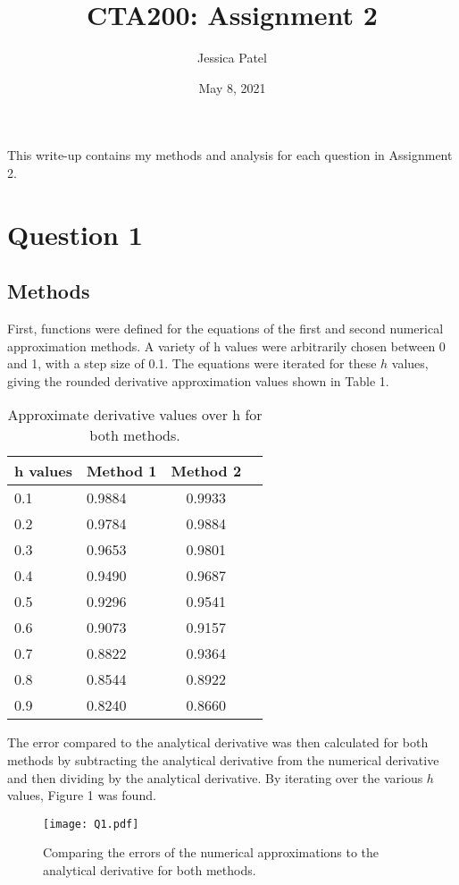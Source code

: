 \documentclass[12pt]{article}
\title{CTA200: Assignment 2}
\author{Jessica Patel}
\date{May 8, 2021}
\begin{document}
\maketitle

This write-up contains my methods and analysis for each question in Assignment 2.
\section{Question 1}
\subsection{Methods}
First, functions were defined for the equations of the first and second numerical approximation methods. A variety of h values were arbitrarily chosen between 0 and 1, with a step size of 0.1. The equations were iterated for these $h$ values, giving the rounded derivative approximation values shown in Table 1.

\begin{table}[h]
\centering

\begin{tabular}{l|lcr}
h values & Method 1 & Method 2\\
\hline
0.1 &0.9884 & 0.9933 \\
0.2 & 0.9784&0.9884 \\
0.3 & 0.9653&  0.9801\\
0.4 & 0.9490& 0.9687\\
0.5 &  0.9296& 0.9541\\
0.6 & 0.9073&   0.9157\\
0.7 & 0.8822& 0.9364\\
0.8 & 0.8544& 0.8922 \\
0.9 & 0.8240& 0.8660\\
\hline
\end{tabular}

\caption{Approximate derivative values over h for both methods.}
\end{table}

The error compared to the analytical derivative was then calculated for both methods by subtracting the analytical derivative from the numerical derivative and then dividing by the analytical derivative. By iterating over the various $h$ values, Figure 1 was found.

\begin{figure}[h]
\begin{center}
\texttt{[image: Q1.pdf]}
\caption{Comparing the errors of the numerical approximations to the analytical derivative for both methods.}
\end{center}
\end{figure}
\end{document}
